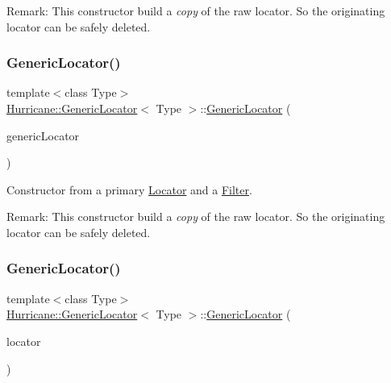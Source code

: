 \begin{DoxyParagraph}{Remark\+: This constructor build a {\itshape copy} of the raw locator. So the originating}
locator can be safely deleted. 
\end{DoxyParagraph}
\mbox{\label{classHurricane_1_1GenericLocator_aa314dea86573d1cee1d1eea8ac2ab49e}} 
\subsubsection{\texorpdfstring{Generic\+Locator()}{GenericLocator()}\hspace{0.1cm}{\footnotesize\ttfamily [2/3]}}
{\footnotesize\ttfamily template$<$class Type$>$ \\
\mbox{\hyperlink{classHurricane_1_1GenericLocator}{Hurricane\+::\+Generic\+Locator}}$<$ Type $>$\+::\mbox{\hyperlink{classHurricane_1_1GenericLocator}{Generic\+Locator}} (\begin{DoxyParamCaption}\item[{const \mbox{\hyperlink{classHurricane_1_1GenericLocator}{Generic\+Locator}}$<$ Type $>$ \&}]{generic\+Locator }\end{DoxyParamCaption})\hspace{0.3cm}{\ttfamily [inline]}}

Constructor from a primary \mbox{\hyperlink{classHurricane_1_1Locator}{Locator}} and a \mbox{\hyperlink{classHurricane_1_1Filter}{Filter}}.

\begin{DoxyParagraph}{Remark\+: This constructor build a {\itshape copy} of the raw locator. So the originating}
locator can be safely deleted. 
\end{DoxyParagraph}
\mbox{\label{classHurricane_1_1GenericLocator_a4706b6502b806f90f2374df76791a729}} 
\subsubsection{\texorpdfstring{Generic\+Locator()}{GenericLocator()}\hspace{0.1cm}{\footnotesize\ttfamily [3/3]}}
{\footnotesize\ttfamily template$<$class Type$>$ \\
\mbox{\hyperlink{classHurricane_1_1GenericLocator}{Hurricane\+::\+Generic\+Locator}}$<$ Type $>$\+::\mbox{\hyperlink{classHurricane_1_1GenericLocator}{Generic\+Locator}} (\begin{DoxyParamCaption}\item[{\mbox{\hyperlink{classHurricane_1_1Locator}{Locator}}$<$ Type $>$ $\ast$}]{locator }\end{DoxyParamCaption})\hspace{0.3cm}{\ttfamily [inline]}}

